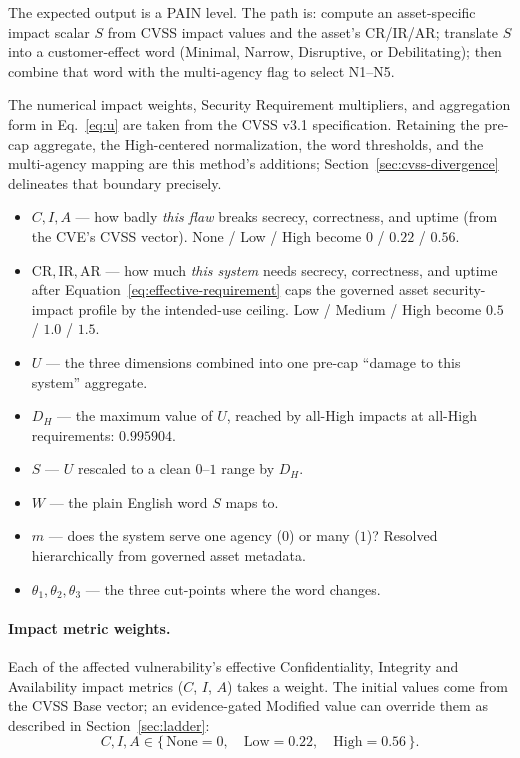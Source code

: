 \documentclass[11pt]{article}
\begin{document}
The expected output is a PAIN level. The path is: compute an asset-specific
impact scalar $S$ from CVSS impact values and the asset's CR/IR/AR; translate
$S$ into a customer-effect word (Minimal, Narrow, Disruptive, or Debilitating);
then combine that word with the multi-agency flag to select N1--N5.

The numerical impact weights, Security Requirement multipliers, and aggregation
form in Eq.~\eqref{eq:u} are taken from the CVSS v3.1 specification. Retaining the
pre-cap aggregate, the High-centered normalization, the word thresholds, and the
multi-agency mapping are this method's additions;
Section~\ref{sec:cvss-divergence} delineates that boundary precisely.

\begin{notation}
\begin{itemize}[leftmargin=1.3em,nosep,topsep=2pt]
\item $C, I, A$ --- how badly \emph{this flaw} breaks secrecy, correctness, and
  uptime (from the CVE's CVSS vector). None / Low / High become $0$ / $0.22$ / $0.56$.
\item $\mathrm{CR},\mathrm{IR},\mathrm{AR}$ --- how much \emph{this system} needs
  secrecy, correctness, and uptime after Equation~\eqref{eq:effective-requirement}
  caps the governed asset security-impact profile by the intended-use ceiling.
  Low / Medium / High become $0.5$ / $1.0$ / $1.5$.
\item $U$ --- the three dimensions combined into one pre-cap ``damage to this
  system'' aggregate.
\item $D_H$ --- the maximum value of $U$, reached by all-High impacts at all-High
  requirements: $0.995904$.
\item $S$ --- $U$ rescaled to a clean $0$--$1$ range by $D_H$.
\item $W$ --- the plain English word $S$ maps to.
\item $m$ --- does the system serve one agency ($0$) or many ($1$)? Resolved
  hierarchically from governed asset metadata.
\item $\theta_1,\theta_2,\theta_3$ --- the three cut-points where the word changes.
\end{itemize}
\end{notation}

\paragraph{Impact metric weights.}
Each of the affected vulnerability's effective Confidentiality, Integrity and
Availability impact metrics ($C$, $I$, $A$) takes a weight. The initial values come
from the CVSS Base vector; an evidence-gated Modified value can override them as
described in Section~\ref{sec:ladder}:
\[
C, I, A \in \{\,\text{None}=0,\quad \text{Low}=0.22,\quad \text{High}=0.56\,\}.
\]
\end{document}

